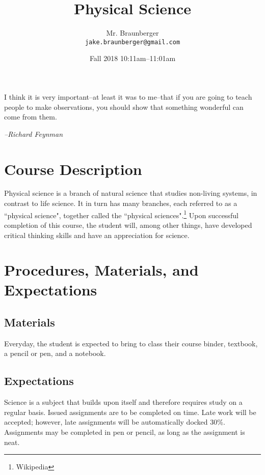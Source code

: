 \documentclass[11pt,article,oneside]{memoir}
\begin{document}
\title{\LARGE Physical Science}
\author{\Large Mr. Braunberger \newline \\ \footnotesize\texttt{\noindent jake.braunberger@gmail.com}}
\date{\hspace*{2.3cm}Fall 2018 \newline \noindent \hspace*{-1.4cm} 10:11am--11:01am}

\setlength{\epigraphwidth}{.8\textwidth}

\maketitle

\epigraph{I think it is very important--at least it was to me--that if you are going to teach people to make observations, you should show that something wonderful can come from them.}{\textit{--Richard Feynman}}




\section*{Course Description}
Physical science is a branch of natural science that studies non-living systems, in contrast to life science. It in turn has many branches, each referred to as a ``physical science", together called the ``physical sciences".\footnote{Wikipedia} Upon successful completion
 of this course, the student will, among other things, have
developed critical thinking skills and have an appreciation for science.


\section*{Procedures, Materials, and Expectations}
\subsection*{Materials}
	Everyday, the student is expected to bring to class their course binder, textbook, a pencil or pen, and a notebook. 
\subsection*{Expectations}
	Science is a subject that builds upon itself and therefore requires study on a regular basis.
	Issued assignments are to be completed on time. Late work will be accepted; however,
late assignments will be automatically docked 30\%. Assignments may be completed in pen or pencil, as long as the assignment is neat.
\end{document}
